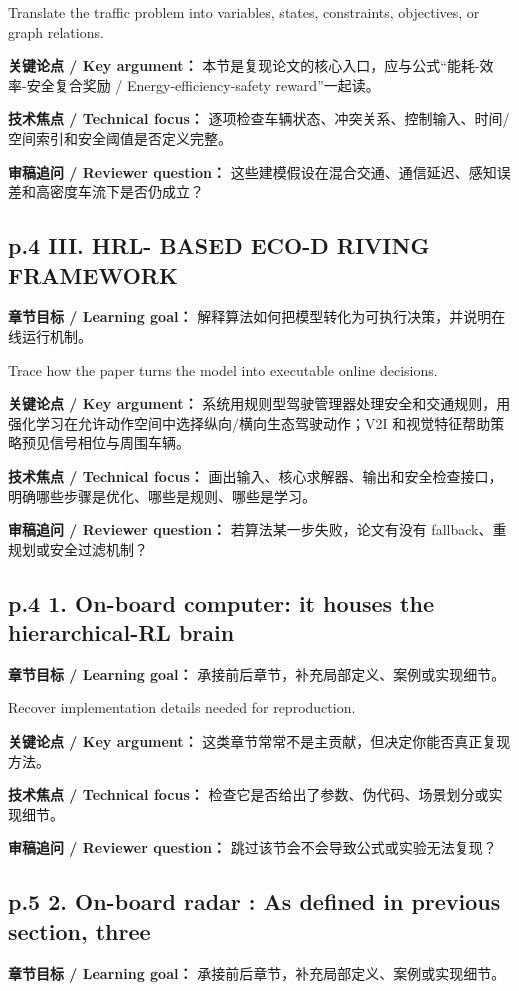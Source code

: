 \documentclass[UTF8,a4paper,11pt,fontset=fandol]{ctexart}
\begin{document}
Translate the traffic problem into variables, states, constraints, objectives, or graph relations.

\textbf{关键论点 / Key argument：} 本节是复现论文的核心入口，应与公式“能耗-效率-安全复合奖励 / Energy-efficiency-safety reward”一起读。

\textbf{技术焦点 / Technical focus：} 逐项检查车辆状态、冲突关系、控制输入、时间/空间索引和安全阈值是否定义完整。

\textbf{审稿追问 / Reviewer question：} 这些建模假设在混合交通、通信延迟、感知误差和高密度车流下是否仍成立？

\subsection*{p.4 III. HRL- BASED ECO-D RIVING FRAMEWORK}
\textbf{章节目标 / Learning goal：} 解释算法如何把模型转化为可执行决策，并说明在线运行机制。

Trace how the paper turns the model into executable online decisions.

\textbf{关键论点 / Key argument：} 系统用规则型驾驶管理器处理安全和交通规则，用强化学习在允许动作空间中选择纵向/横向生态驾驶动作；V2I 和视觉特征帮助策略预见信号相位与周围车辆。

\textbf{技术焦点 / Technical focus：} 画出输入、核心求解器、输出和安全检查接口，明确哪些步骤是优化、哪些是规则、哪些是学习。

\textbf{审稿追问 / Reviewer question：} 若算法某一步失败，论文有没有 fallback、重规划或安全过滤机制？

\subsection*{p.4 1. On-board computer: it houses the hierarchical-RL brain}
\textbf{章节目标 / Learning goal：} 承接前后章节，补充局部定义、案例或实现细节。

Recover implementation details needed for reproduction.

\textbf{关键论点 / Key argument：} 这类章节常常不是主贡献，但决定你能否真正复现方法。

\textbf{技术焦点 / Technical focus：} 检查它是否给出了参数、伪代码、场景划分或实现细节。

\textbf{审稿追问 / Reviewer question：} 跳过该节会不会导致公式或实验无法复现？

\subsection*{p.5 2. On-board radar : As deﬁned in previous section, three}
\textbf{章节目标 / Learning goal：} 承接前后章节，补充局部定义、案例或实现细节。
\end{document}
